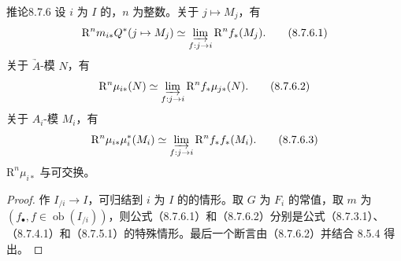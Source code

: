 \begin{SGAresult}{推论}{8.7.6}
设 $i$ 为 $I$ 的，$n$ 为整数。关于 $j\mapsto M_j$，有
\[
 \mathrm R^nm_{i*}Q^*(j\mapsto M_j)\simeq
 \varinjlim_{f:j\to i}\mathrm R^nf_*(M_j).\tag{8.7.6.1}
\]
关于 $\underrightarrow A$-模 $N$，有
\[
 \mathrm R^n\mu_{i*}(N)\simeq\varinjlim_{f:j\to i}\mathrm R^nf_*\mu_{j*}(N).\tag{8.7.6.2}
\]
关于 $A_i$-模 $M_i$，有
\[
 \mathrm R^n\mu_{i*}\mu_i^*(M_i)\simeq
 \varinjlim_{f:j\to i}\mathrm R^nf_*f_*(M_i).\tag{8.7.6.3}
\]
 $\mathrm R^n\mu_{i*}$ 与可交换。
\end{SGAresult}
\begin{proof}
作 $I_{/i}\to I$，可归结到 $i$ 为 $I$ 的的情形。取 $G$ 为 $F_i$ 的常值，取 $m$ 为 $(f_\bullet,f\in\operatorname{ob}(I_{/i}))$，则公式（8.7.6.1）和（8.7.6.2）分别是公式（8.7.3.1）、（8.7.4.1）和（8.7.5.1）的特殊情形。最后一个断言由（8.7.6.2）并结合 8.5.4 得出。
\end{proof}

